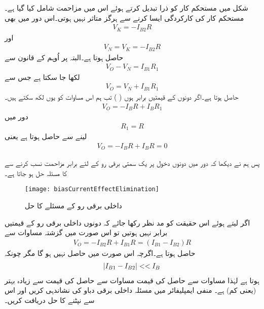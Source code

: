 	شکل  میں مستحکم کار کو ذرا تبدیل کرتے ہوئے اس میں مزاحمت  شامل کیا گیا ہے۔مستحکم کار کی کارکردگی ایسا کرنے سے ہرگز متاثر نہیں ہوتی۔اس دور میں بھی
\begin{align*}
V_K=-I_{B2}R
\end{align*}
اور
\begin{align*}
V_N=V_K=-I_{B2}R
\end{align*}
حاصل ہوتا ہے۔البتہ  پر اُوہم کے قانون سے
\begin{align*}
V_O-V_N=I_{B1}R_1
\end{align*}
لکھا جا سکتا ہے جس سے
\begin{align*}
V_O=V_N+I_{B1}R_1
\end{align*}
حاصل ہوتا ہے۔اگر دونوں  کے قیمتیں برابر ہوں ( ) تب ہم اس مساوات کو یوں لکھ سکتے ہیں۔
\begin{align*}
V_O=-I_B R +I_B R_1
\end{align*}
دور میں
\begin{align}
R_1=R
\end{align}
لینے سے حاصل ہوتا ہے یعنی
\begin{align*}
V_O=-I_B R +I_B R=0
\end{align*}

پس ہم نے دیکھا کہ دور میں دونوں دخول پر یک سمتی برقی رو کے لئے برابر مزاحمت نسب کرنے سے  کا مسئلہ حل ہو جاتا ہے۔
\begin{figure}
\centering
\texttt{[image: biasCurrentEffectElimination]}
\caption{داخلی برقی رو کے مسئلے کا حل}
\label{شکل_داخلی_برقی_رو_کے_مسئلے_کا_حل}
\end{figure}

اگر لیتے ہوئے اس حقیقت کو مد نظر رکھا جائے کہ دونوں داخلی برقی رو کے قیمتیں برابر نہیں ہوتیں تو اس صورت میں گزشتہ مساوات سے
\begin{align} \label{مساوات_انحرافی_رو_سے_پیدا_درست_دباو}
V_O=-I_{B2}R+I_{B1}R=\left (I_{B1}-I_{B2} \right )R
\end{align}
حاصل ہوتا ہے۔اگرچہ اس صورت میں  حاصل نہیں ہو گا مگر چونکہ
\begin{align*}
\abs{I_{B1}-I_{B2}} << I_B
\end{align*} 
ہوتا ہے لہٰذا مساوات  سے حاصل  کی قیمت مساوات   سے حاصل  کی قیمت سے زیادہ بہتر (یعنی کم) ہے۔
منفی ایمپلیفائر میں مسئلہ داخلی برقی دباو کی نشاندہی کریں اور اس سے نپٹنے کا حل دریافت کریں۔


